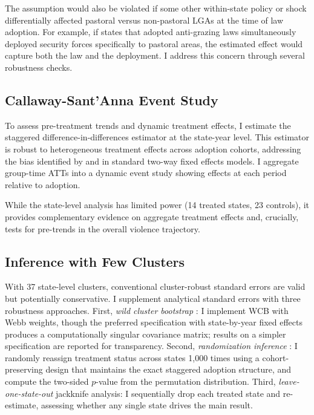 \documentclass[12pt]{article}
\begin{document}
The assumption would also be violated if some other within-state policy or shock differentially affected pastoral versus non-pastoral LGAs at the time of law adoption. For example, if states that adopted anti-grazing laws simultaneously deployed security forces specifically to pastoral areas, the estimated effect would capture both the law and the deployment. I address this concern through several robustness checks.

\subsection{Callaway-Sant'Anna Event Study}

To assess pre-treatment trends and dynamic treatment effects, I estimate the \citet{callaway2021difference} staggered difference-in-differences estimator at the state-year level. This estimator is robust to heterogeneous treatment effects across adoption cohorts, addressing the bias identified by \citet{goodmanbacon2021difference} and \citet{dechaisemartin2020two} in standard two-way fixed effects models. I aggregate group-time ATTs into a dynamic event study showing effects at each period relative to adoption.

While the state-level analysis has limited power (14 treated states, 23 controls), it provides complementary evidence on aggregate treatment effects and, crucially, tests for pre-trends in the overall violence trajectory.

\subsection{Inference with Few Clusters}

With 37 state-level clusters, conventional cluster-robust standard errors are valid but potentially conservative. I supplement analytical standard errors with three robustness approaches. First, \textit{wild cluster bootstrap} \citep{cameron2008bootstrap}: I implement WCB with Webb weights, though the preferred specification with state-by-year fixed effects produces a computationally singular covariance matrix; results on a simpler specification are reported for transparency. Second, \textit{randomization inference} \citep{fisher1935design}: I randomly reassign treatment status across states 1,000 times using a cohort-preserving design that maintains the exact staggered adoption structure, and compute the two-sided $p$-value from the permutation distribution. Third, \textit{leave-one-state-out} jackknife analysis: I sequentially drop each treated state and re-estimate, assessing whether any single state drives the main result.
\end{document}
